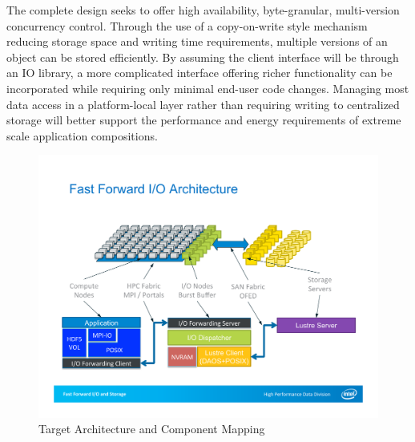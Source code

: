 \documentclass[conference]{IEEEtran} \pdfpagewidth=8.5in
\begin{document}
The complete design seeks to offer high availability, byte-granular,
multi-version concurrency control. Through the use of a copy-on-write style
mechanism reducing storage space and writing time requirements, multiple
versions of an object can be stored efficiently. By assuming the client
interface will be through an IO library, a more complicated interface offering
richer functionality can be incorporated while requiring only minimal end-user
code changes.  Managing most data access in a platform-local layer rather than
requiring writing to centralized storage will better support the performance
and energy requirements of extreme scale application compositions.



\begin{figure}[htbp]
\centering
\includegraphics[width=\columnwidth]{images/arch-mapping}
\caption{Target Architecture and Component Mapping}
\label{fig:arch-mapping}
\end{figure}
\end{document}

